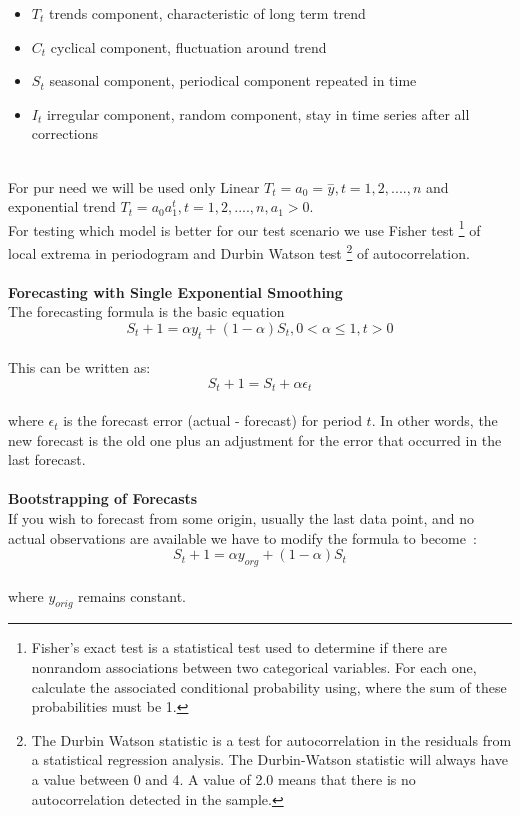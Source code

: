 \begin{itemize}
	\item $T_t$ trends component, characteristic of long term trend
	\item $C_t$ cyclical component, fluctuation around trend
	\item $S_t$ seasonal component, periodical component repeated in time
	\item $I_t$ irregular component, random component, stay in time series after all corrections
\end{itemize}
\\
For pur need we will be used only Linear $T_t = a_0 = \overset{-}{y}, t = 1,2, ...., n$ and exponential trend
$T_t = a_{0}a_1^t, t = 1,2,....,n, a_1 > 0$.
\\
For testing which model is better for our test scenario we use Fisher test \footnote{Fisher's exact test is a statistical test
used to determine if there are nonrandom associations between two categorical variables.
For each one, calculate the associated conditional probability using, where the sum of these probabilities must be 1.} of local extrema
in periodogram and Durbin Watson test \footnote{The Durbin Watson statistic is a test for autocorrelation in the residuals
from a statistical regression analysis.
The Durbin-Watson statistic will always have a value between 0 and 4.
A value of 2.0 means that there is no autocorrelation detected in the sample.} of autocorrelation.\\
\\
\textbf{Forecasting with Single Exponential Smoothing} \label{subsec:statistics_forecast}
\\
The forecasting formula is the basic equation~\cite{benkova}
\begin{equation} \label{eq:21}
S_t+1 = \alpha y_t+(1−\alpha)S_t, 0< \alpha \leq 1,t>0
\end{equation}
\\
This can be written as:
\begin{equation} \label{eq:22}
S_t+1=S_t+\alpha \epsilon_t
\end{equation}
\\
where $\epsilon_t$ is the forecast error (actual - forecast) for period $t$.
In other words, the new forecast is the old one plus an adjustment for the error that occurred in the last forecast.\\
\\
\textbf{Bootstrapping of Forecasts}\\
If you wish to forecast from some origin, usually the last data point, and no actual observations are available
we have to modify the formula to become~\cite{benkova}:
\\
\begin{equation} \label{eq:23}
S_t+1 = \alpha y_{org}+(1−\alpha)S_t
\end{equation}
\\
where $y_{orig}$ remains constant.
